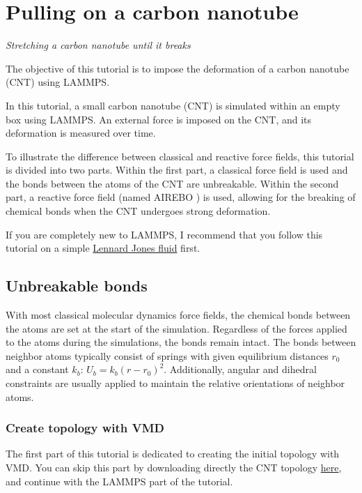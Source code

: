\chapter{Pulling on a carbon nanotube}
\label{carbon-nanotube-label}

\noindent \vspace{-1cm} \noindent \textcolor{graytitle}{\textit{{\Large Stretching a carbon nanotube until it breaks}}\vspace{0.5cm} }

\vspace{0.25cm} \noindent The objective of this tutorial is to impose the deformation
of a carbon nanotube (CNT) using LAMMPS.

\vspace{0.25cm} \noindent In this tutorial, a small carbon nanotube (CNT) is simulated
within an empty box using LAMMPS. An external 
force is imposed on the CNT, and its deformation is measured over time.

\vspace{0.25cm} \noindent To illustrate the difference between classical and reactive force fields,
this tutorial is divided into two parts. Within the first part, a classical
force field is used and the bonds between the atoms of the CNT are
unbreakable. Within the second part, a reactive force field
(named AIREBO \cite{stuart2000reactive}) is used, allowing for the breaking
of chemical bonds when the CNT undergoes strong deformation.

\vspace{0.25cm} \noindent If you are completely new to LAMMPS, I recommend that
you follow this tutorial on a simple \hyperref[lennard-jones-label]{Lennard Jones fluid} first.

\section{Unbreakable bonds}
\noindent With most classical molecular dynamics force fields, the chemical bonds
between the atoms are set at the start of the simulation. Regardless of the 
forces applied to the atoms during the simulations, the bonds remain intact.
The bonds between neighbor atoms typically consist of springs with
given equilibrium distances $r_0$ and a constant $k_b$:
$U_b = k_b \left( r - r_0 \right)^2$.
Additionally, angular and dihedral constraints are usually applied to maintain
the relative orientations of neighbor atoms. 

\subsection{Create topology with VMD}
\noindent The first part of this tutorial is dedicated to creating
the initial topology with VMD. You can skip this part by
downloading directly the CNT topology \href{https://lammpstutorials.github.io/lammpstutorials-inputs/level1/breaking-a-carbon-nanotube/unbreakable-bonds/cnt_molecular.data}{here}, 
and continue with the LAMMPS part of the tutorial.

